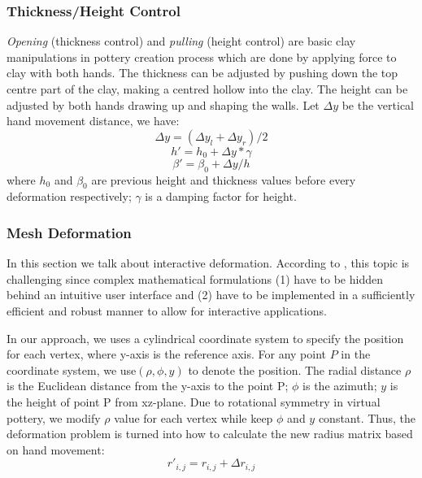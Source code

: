 \documentclass{svjour3}                     %
\begin{document}
\subsubsection{Thickness/Height Control}
\label{sec:4.2.2}
\textit{Opening} (thickness control) and \textit{pulling} (height control) are basic clay manipulations in pottery creation process which are done by applying force to clay with both hands. The thickness can be adjusted by pushing down the top centre part of the clay, making a centred hollow into the clay. The height can be adjusted by both hands drawing up and shaping the walls.
 Let $\Delta y$ be the vertical hand movement distance, we have:
\begin{equation}
\Delta y = (\Delta y_{l} + \Delta y_{r})/2
\end{equation}
\begin{equation}
h' = h_{0} + \Delta y * \gamma
\end{equation}
\begin{equation}
\beta' = \beta_{0} + \Delta y/ h
\end{equation}
where $h_{0}$ and $\beta_{0}$ are previous height and thickness values before every deformation respectively; $\gamma$ is a damping factor for height.

\subsubsection{Mesh Deformation}
\label{sec:4.2.3}
In this section we talk about interactive deformation. According to \cite{botsch2010polygon}, this topic is challenging since complex mathematical formulations (1) have to be hidden behind an intuitive user interface and (2) have to be implemented in a sufficiently efficient and robust manner to allow for interactive applications.

In our approach, we uses a cylindrical coordinate system to specify the position for each vertex, where y-axis is the reference axis. For any point $P$ in the coordinate system, we use$(\rho, \phi, y)$ to denote the position. The radial distance $\rho$ is the Euclidean distance from the y-axis to the point P; $\phi$ is the azimuth; $y$ is the height of point P from xz-plane.
Due to rotational symmetry in virtual pottery, we modify $\rho$ value for each vertex while keep $\phi$ and $y$ constant. Thus, the deformation problem is turned into how to calculate the new radius matrix based on hand movement:
\begin{equation}
r'_{i,j} = r_{i,j} + \Delta r_{i,j}
\end{equation}
\end{document}
